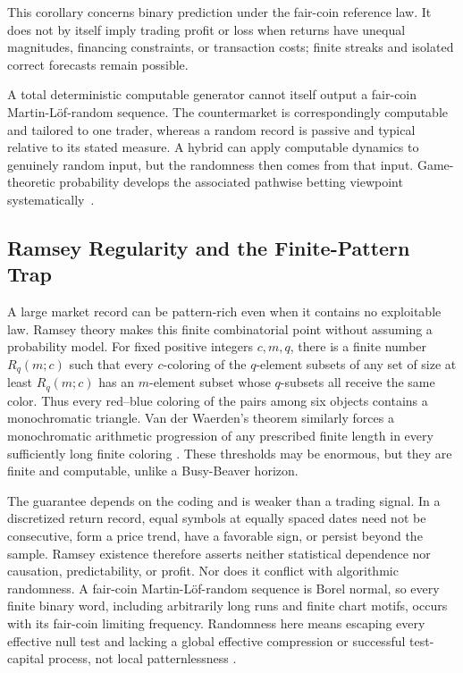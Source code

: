 \documentclass[aps,pra,reprint,superscriptaddress,amsmath,amssymb,floatfix]{revtex4-2}
\theoremstyle{plain}
\theoremstyle{definition}
\theoremstyle{remark}
\begin{document}
This corollary concerns binary prediction under the fair-coin reference law.
It does not by itself imply trading profit or loss when returns have unequal
magnitudes, financing constraints, or transaction costs; finite streaks and
isolated correct forecasts remain possible.

A total deterministic computable generator cannot itself output a fair-coin
Martin-L\"of-random sequence. The countermarket is correspondingly computable
and tailored to one trader, whereas a random record is passive and typical
relative to its stated measure. A hybrid can apply computable dynamics to
genuinely random input, but the randomness then comes from that input.
Game-theoretic probability develops the associated pathwise betting viewpoint
systematically~\cite{ShaferVovk2001}.

\subsection{Ramsey Regularity and the Finite-Pattern Trap}
\label{sec:ramseytrap}

A large market record can be pattern-rich even when it contains no exploitable
law. Ramsey theory makes this finite combinatorial point without assuming a
probability model. For fixed positive integers \(c,m,q\), there is a finite
number \(R_q(m;c)\) such that every \(c\)-coloring of the \(q\)-element subsets
of any set of size at least \(R_q(m;c)\) has an \(m\)-element subset whose
\(q\)-subsets all receive the same color. Thus every red--blue coloring of the
pairs among six objects contains a monochromatic triangle. Van der Waerden's
theorem similarly forces a monochromatic arithmetic progression of any
prescribed finite length in every sufficiently long finite coloring
\cite{Ramsey-GRS-90,GS-90}. These thresholds may be enormous, but they are
finite and computable, unlike a Busy-Beaver horizon.

The guarantee depends on the coding and is weaker than a trading signal. In a
discretized return record, equal symbols at equally spaced dates need not be
consecutive, form a price trend, have a favorable sign, or persist beyond the
sample. Ramsey existence therefore asserts neither statistical dependence nor
causation, predictability, or profit. Nor does it conflict with algorithmic
randomness. A fair-coin Martin-L\"of-random sequence is Borel normal, so every
finite binary word, including arbitrarily long runs and finite chart motifs,
occurs with its fair-coin limiting frequency. Randomness here means escaping
every effective null test and lacking a global effective compression or
successful test-capital process, not local patternlessness
\cite{calude:02,Nies2009}.
\end{document}
